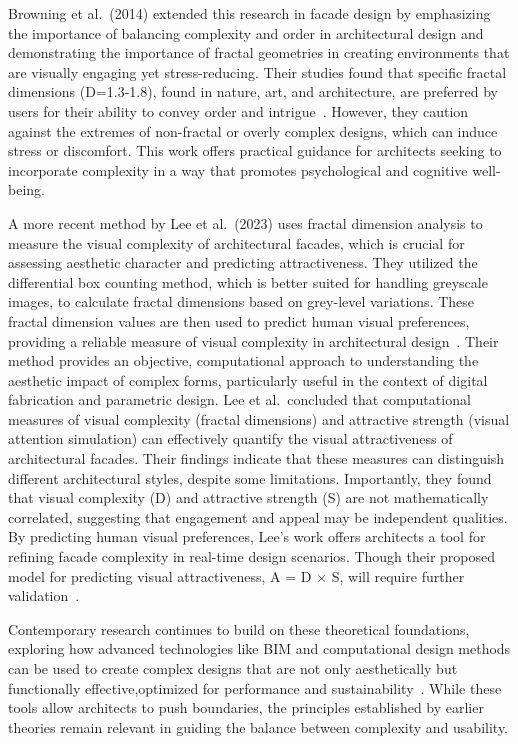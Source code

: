 Browning et al.~(2014) extended this research in facade design by emphasizing the importance of balancing complexity and order in architectural design and demonstrating the importance of fractal geometries in creating environments that are visually engaging yet stress-reducing.
Their studies found that specific fractal dimensions (D=1.3-1.8), found in nature, art, and architecture, are preferred by users for their ability to convey order and intrigue~\cite{Browning2014}.
However, they caution against the extremes of non-fractal or overly complex designs, which can induce stress or discomfort.
This work offers practical guidance for architects seeking to incorporate complexity in a way that promotes psychological and cognitive well-being.

A more recent method by Lee et al.~(2023) uses fractal dimension analysis to measure the visual complexity of architectural facades, which is crucial for assessing aesthetic character and predicting attractiveness.
They utilized the differential box counting method, which is better suited for handling greyscale images, to calculate fractal dimensions based on grey-level variations.
These fractal dimension values are then used to predict human visual preferences, providing a reliable measure of visual complexity in architectural design~\cite{Lee2023}.
Their method provides an objective, computational approach to understanding the aesthetic impact of complex forms, particularly useful in the context of digital fabrication and parametric design.
Lee et al.~concluded that computational measures of visual complexity (fractal dimensions) and attractive strength (visual attention simulation) can effectively quantify the visual attractiveness of architectural facades.
Their findings indicate that these measures can distinguish different architectural styles, despite some limitations.
Importantly, they found that visual complexity (D) and attractive strength (S) are not mathematically correlated, suggesting that engagement and appeal may be independent qualities.
By predicting human visual preferences, Lee’s work offers architects a tool for refining facade complexity in real-time design scenarios.
Though their proposed model for predicting visual attractiveness, A = D × S, will require further validation~\cite{Lee2023}.

Contemporary research continues to build on these theoretical foundations, exploring how advanced technologies like BIM and computational design methods can be used to create complex designs that are not only aesthetically but functionally effective,optimized for performance and sustainability~\cite{Leach2016}.
While these tools allow architects to push boundaries, the principles established by earlier theories remain relevant in guiding the balance between complexity and usability.


